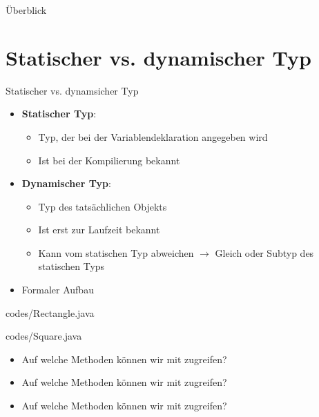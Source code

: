 \documentclass{../tuda-beamer}
\date{01. Dezember 2021}
\begin{document}
  \maketitle

  \begin{frame}{Überblick}
    \tableofcontents
  \end{frame}


  \section{Statischer vs. dynamischer Typ}
  \begin{frame}{Statischer vs. dynamsicher Typ}
    \begin{itemize}
      \item \textbf{Statischer Typ}:
      \begin{itemize}
        \item Typ, der bei der Variablendeklaration angegeben wird
        \item Ist bei der Kompilierung bekannt
      \end{itemize}
      \item \textbf{Dynamischer Typ}:
      \begin{itemize}
        \item Typ des tatsächlichen Objekts
        \item Ist erst zur Laufzeit bekannt
        \item Kann vom statischen Typ abweichen \(\rightarrow\) Gleich oder Subtyp des statischen
        Typs
      \end{itemize}
      \item Formaler Aufbau
      \begin{center}
      \end{center}
    \end{itemize}
  \end{frame}

  \begin{frame}
     {codes/Rectangle.java}
  \end{frame}

  \begin{frame}
     {codes/Square.java}
  \end{frame}

  \begin{frame}
    \begin{itemize}
      \item Auf welche Methoden können wir mit  zugreifen?
      \item Auf welche Methoden können wir mit  zugreifen?
      \item Auf welche Methoden können wir mit  zugreifen?
    \end{itemize}

    \br

    
  \end{frame}
\end{document}
